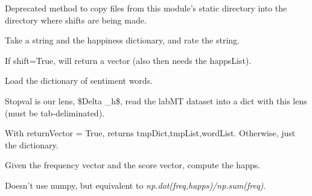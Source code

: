 \begin{fulllineitems}
\label{labMTsimple:labMTsimple.storyLab.copy_static_files}
Deprecated method to copy files from this module's static directory into the directory where shifts are being made.

\end{fulllineitems}


\begin{fulllineitems}
\label{labMTsimple:labMTsimple.storyLab.emotion}
Take a string and the happiness dictionary, and rate the string.

If shift=True, will return a vector (also then needs the happsList).

\end{fulllineitems}


\begin{fulllineitems}
\label{labMTsimple:labMTsimple.storyLab.emotionFileReader}
Load the dictionary of sentiment words.

Stopval is our lens, \$Delta \_h\$, read the labMT dataset into a dict with this lens (must be tab-deliminated).

With returnVector = True, returns tmpDict,tmpList,wordList. Otherwise, just the dictionary.

\end{fulllineitems}


\begin{fulllineitems}
\label{labMTsimple:labMTsimple.storyLab.emotionV}
Given the frequency vector and the score vector, compute the happs.

Doesn't use numpy, but equivalent to \emph{np.dot(freq,happs)/np.sum(freq)}.

\end{fulllineitems}

